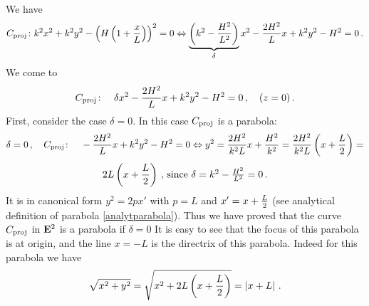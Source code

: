 \documentclass[12pt]{article}
\numberwithin{equation}{section}
\begin{document}
We have   \begin{equation*}
C_{\rm proj}\colon k^2x^2+k^2y^2-
   \left(H\left(1+{x\over L}\right)\right)^2=0\Leftrightarrow
   \underbrace{\left(k^2-{H^2\over L^2}\right)}_{\delta}
         x^2-{2H^2\over L}x+k^2y^2-H^2=0\,.
           \end{equation*}
We come to  
   \begin{equation*}
C_{\rm proj}\colon \quad
 \delta x^2-{2H^2\over L}x+k^2y^2-H^2=0\,,\quad (z=0)\,.
           \end{equation*}      
First, consider the case $\delta=0$.
In this case $C_{\rm proj}$ is a parabola:
       \begin{equation}\label{parabolaintheproofofconicsectionstheorem}
\delta=0\,, \quad
C_{\rm proj}\colon \quad -{2H^2\over L}x+k^2y^2-H^2=0
\Leftrightarrow
             y^2={2H^2\over k^2L}x+{H^2\over k^2}=
          {2H^2\over k^2L}\left(x+{L\over 2}\right)=
           \end{equation}
     \begin{equation*}
      2L\left(x+{L\over 2}\right)\,,\, 
\hbox{since $\delta=k^2-{H^2\over L^2}=0$}\,.
     \end{equation*}
      It is in canonical
form $y^2=2px'$ with $p=L$ and $x'=x+{L\over 2}$ (see analytical definition of
parabola \eqref{analytparabola}).
Thus we  have proved that the curve $C_{\rm proj}$ in ${\bf E}^2$
is a parabola if $\delta=0$
It is easy to see that the focus of this parabola is 
at origin, and the line $x=-L$ is the directrix of 
this parabola.  Indeed for this parabola we have
  \begin{equation*}
\sqrt {x^2+y^2}=
\sqrt {x^2+2L\left(x+{L\over 2}\right)}=\left|x+L\right|\,.
\end{equation*}

\smallskip
\end{document}
